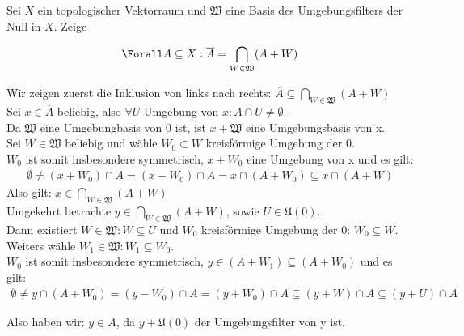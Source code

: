 \begin{exercise}

Sei $X$ ein topologischer Vektorraum und $\mathfrak{W}$ eine Basis des Umgebungsfilters der Null in $X$.
Zeige

\begin{align*}
  \Forall A \subseteq X:
  \overline{A} = \bigcap_{W \in \mathfrak{W}}(A + W)
\end{align*}

\end{exercise}

\begin{solution}

Wir zeigen zuerst die Inklusion von links nach rechts: $\overline{A} \subseteq \bigcap_{W \in \mathfrak{W}}(A + W)$\\
Sei $x \in \overline{A}$ beliebig, also $\forall U$ Umgebung von $x: A \cap U \neq \emptyset$. \\
Da $\mathfrak{W}$ eine Umgebungbasis von 0 ist, ist $x + \mathfrak{W}$ eine Umgebungsbasis von x. \\
Sei $W \in \mathfrak{W}$ beliebig und wähle $W_0 \subset W$ kreisförmige Umgebung der 0. \\
$W_0$ ist somit insbesondere symmetrisch, $x + W_0$ eine Umgebung von x und es gilt:
\begin{align*}
\emptyset \neq (x + W_0) \cap A = (x - W_0) \cap A = x \cap (A + W_0) \subseteq x \cap (A + W)
\end{align*}
Also gilt: $x \in \bigcap_{W \in \mathfrak{W}}(A + W)$ \\

Umgekehrt betrachte $y \in \bigcap_{W \in \mathfrak{W}}(A + W)$, sowie $ U \in \mathfrak{U}(0)$. \\
Dann existiert $W \in \mathfrak{W}: W \subseteq U$ und $W_0$ kreisförmige Umgebung der 0: $W_0 \subseteq W$. \\
Weiters wähle $W_1 \in \mathfrak{W}: W_1 \subseteq W_0$. \\
$W_0$ ist somit insbesondere symmetrisch, $y \in (A + W_1) \subseteq (A + W_0)$ und es gilt:
\begin{align*}
  \emptyset \neq y \cap (A + W_0) = (y - W_0) \cap A = (y + W_0) \cap A \subseteq (y + W) \cap A \subseteq (y + U) \cap A
\end{align*}

Also haben wir: $y \in \overline{A}$, da $y + \mathfrak{U}(0)$ der Umgebungsfilter von y ist.

\end{solution}
